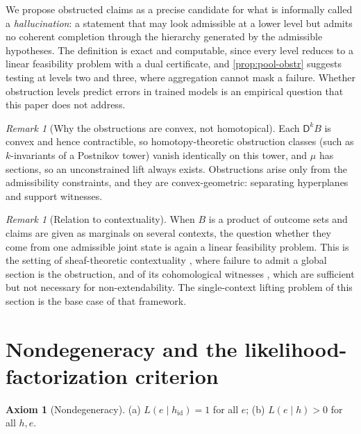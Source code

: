 \documentclass[11pt]{article}
\theoremstyle{definition}
\newtheorem{axiom}[theorem]{Axiom}
\theoremstyle{remark}
\newtheorem{remark}[theorem]{Remark}
\newcommand{\D}{\mathsf{D}}
\newcommand{\hid}{h_{\mathrm{id}}}
\begin{document}
We propose obstructed claims as a precise candidate for what is informally called a
\emph{hallucination}: a statement that may look admissible at a lower level but admits no coherent
completion through the hierarchy generated by the admissible hypotheses. The definition is exact
and computable, since every level reduces to a linear feasibility problem with a dual certificate,
and \cref{prop:pool-obstr} suggests testing at levels two and three, where aggregation cannot mask a
failure. Whether obstruction levels predict errors in trained models is an empirical question that
this paper does not address.

\begin{remark}[Why the obstructions are convex, not homotopical]
Each $\D^kB$ is convex and hence contractible, so homotopy-theoretic obstruction classes (such as
$k$-invariants of a Postnikov tower) vanish identically on this tower, and $\mu$ has sections, so an
unconstrained lift always exists. Obstructions arise only from the admissibility constraints, and they
are convex-geometric: separating hyperplanes and support witnesses.
\end{remark}

\begin{remark}[Relation to contextuality]
When $B$ is a product of outcome sets and claims are given as marginals on several contexts, the
question whether they come from one admissible joint state is again a linear feasibility problem.
This is the setting of sheaf-theoretic contextuality \cite{AbramskyBrandenburger2011}, where failure to
admit a global section is the obstruction, and of its cohomological witnesses
\cite{AbramskyMansfieldBarbosa2012}, which are sufficient but not necessary for non-extendability. The
single-context lifting problem of this section is the base case of that framework.
\end{remark}

\section{Nondegeneracy and the likelihood-factorization criterion}

\begin{axiom}[Nondegeneracy]\label{ax:nondeg}
(a) $L(e\mid\hid)=1$ for all $e$; (b) $L(e\mid h)>0$ for all $h,e$.
\end{axiom}
\end{document}

